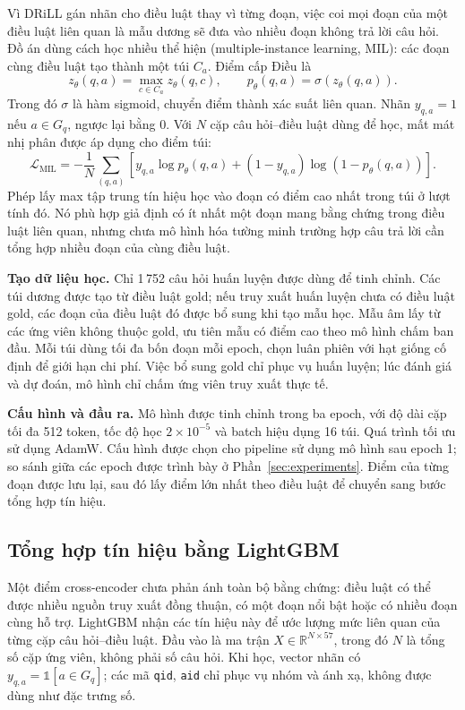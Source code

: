 \documentclass[12pt,a4paper]{article}
\newcommand{\id}[1]{\texttt{#1}}
\begin{document}
Vì DRiLL gán nhãn cho điều luật thay vì từng đoạn, việc coi mọi đoạn của một điều luật liên quan là mẫu dương sẽ đưa vào nhiều đoạn không trả lời câu hỏi. Đồ án dùng cách học nhiều thể hiện (multiple-instance learning, MIL): các đoạn cùng điều luật tạo thành một túi $C_a$. Điểm cấp Điều là
\begin{equation}
z_\theta(q,a)=\max_{c\in C_a}z_\theta(q,c),\qquad p_\theta(q,a)=\sigma\!\left(z_\theta(q,a)\right).\label{eq:mil}
\end{equation}
Trong đó $\sigma$ là hàm sigmoid, chuyển điểm thành xác suất liên quan. Nhãn $y_{q,a}=1$ nếu $a\in G_q$, ngược lại bằng 0. Với $N$ cặp câu hỏi--điều luật dùng để học, mất mát nhị phân được áp dụng cho điểm túi:
\begin{equation}
\mathcal{L}_{\mathrm{MIL}}=-\frac{1}{N}\sum_{(q,a)}
\left[y_{q,a}\log p_\theta(q,a)+(1-y_{q,a})\log(1-p_\theta(q,a))\right].\label{eq:loss}
\end{equation}
Phép lấy max tập trung tín hiệu học vào đoạn có điểm cao nhất trong túi ở lượt tính đó. Nó phù hợp giả định có ít nhất một đoạn mang bằng chứng trong điều luật liên quan, nhưng chưa mô hình hóa tường minh trường hợp câu trả lời cần tổng hợp nhiều đoạn của cùng điều luật.

\textbf{Tạo dữ liệu học.} Chỉ 1\,752 câu hỏi huấn luyện được dùng để tinh chỉnh. Các túi dương được tạo từ điều luật gold; nếu truy xuất huấn luyện chưa có điều luật gold, các đoạn của điều luật đó được bổ sung khi tạo mẫu học. Mẫu âm lấy từ các ứng viên không thuộc gold, ưu tiên mẫu có điểm cao theo mô hình chấm ban đầu. Mỗi túi dùng tối đa bốn đoạn mỗi epoch, chọn luân phiên với hạt giống cố định để giới hạn chi phí. Việc bổ sung gold chỉ phục vụ huấn luyện; lúc đánh giá và dự đoán, mô hình chỉ chấm ứng viên truy xuất thực tế.

\textbf{Cấu hình và đầu ra.} Mô hình được tinh chỉnh trong ba epoch, với độ dài cặp tối đa 512 token, tốc độ học $2\times10^{-5}$ và batch hiệu dụng 16 túi. Quá trình tối ưu sử dụng AdamW. Cấu hình được chọn cho pipeline sử dụng mô hình sau epoch 1; so sánh giữa các epoch được trình bày ở Phần~\ref{sec:experiments}. Điểm của từng đoạn được lưu lại, sau đó lấy điểm lớn nhất theo điều luật để chuyển sang bước tổng hợp tín hiệu.
\clearpage
\subsection{Tổng hợp tín hiệu bằng LightGBM}
Một điểm cross-encoder chưa phản ánh toàn bộ bằng chứng: điều luật có thể được nhiều nguồn truy xuất đồng thuận, có một đoạn nổi bật hoặc có nhiều đoạn cùng hỗ trợ. LightGBM nhận các tín hiệu này để ước lượng mức liên quan của từng cặp câu hỏi--điều luật. Đầu vào là ma trận $X\in\mathbb{R}^{N\times57}$, trong đó $N$ là tổng số cặp ứng viên, không phải số câu hỏi. Khi học, vector nhãn có $y_{q,a}=\mathbb{1}[a\in G_q]$; các mã \id{qid}, \id{aid} chỉ phục vụ nhóm và ánh xạ, không được dùng như đặc trưng số.
\end{document}
